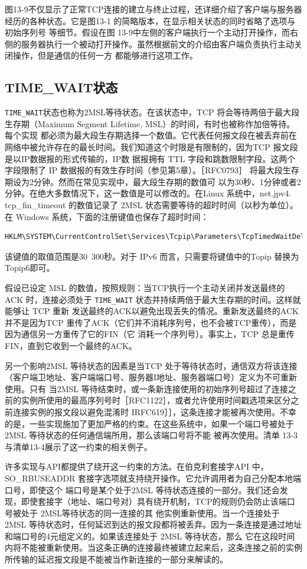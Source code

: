 图13-9不仅显示了正常TCP连接的建立与终止过程，还详细介绍了客户端与服务器经历的各种状态。它是图13-1 的简略版本，在显示相关状态的同时省略了选项与初始序列号
等细节。假设在图 13-9中左侧的客户端执行一个主动打开操作，而右侧的服务器执行一个被动打开操作。虽然根据前文的介绍由客户端负责执行主动关闭操作，但是通信的任何一方
都能够进行这项工作。

\subsection{TIME\_WAIT状态 }
\verb|TIME_WAIT|状态也称为2MSL等待状态。在该状态中，TCP 将会等待两倍于最大段生存期（Maximum Segment Lifetime, MSL）的时间，有时也被称作加倍等待。每个实现
都必须为最大段生存期选择一个数值。它代表任何报文段在被丢弃前在网络中被允许存在的最长时间。我们知道这个时限是有限制的，因为TCP 报文段是以IP数据报的形式传输的，IP数
据报拥有 TTL 字段和跳数限制字段。这两个字段限制了 IP 数据报的有效生存时间（参见第5章）。［RFC0793］ 将最大段生存期设为2分钟。然而在常见实现中，最大段生存期的数值可
以为30秒、1分钟或者2分钟。在绝大多数情况下，这一数值是可以修改的。在Linux 系统中，net.jpv4. tcp\_fin\_timeout 的数值记录了 2MSL 状态需要等待的超时时间（以秒为单位）。
在 Windows 系统，下面的注册键值也保存了超时时间：
\begin{lstlisting}[language=bash]
HKLM\SYSTEM\CurrentControlSet\Services\Tcpip\Parameters\TcpTimedWaitDelay
\end{lstlisting}
该键值的取值范围是30~300秒。对于 IPv6 而言，只需要将键值中的Topip 替换为 Topip6即可。

假设已设定 MSL 的数值，按照规则：当TCP执行一个主动关闭并发送最终的ACK 时，连接必须处于 \verb|TIME_WAIT| 状态并持续两倍于最大生存期的时间。这样就能够让 TCP 重新
发送最终的ACK以避免出现丢失的情况。重新发送最终的ACK 并不是因为TCP 重传了ACK（它们并不消耗序列号，也不会被TCP重传），而是因为通信另一方重传了它的FIN（它
消耗一个序列号）。事实上，TCP 总是重传 FIN，直到它收到一个最终的ACK。

另一个影响2MSL 等待状态的因素是当TCP 处于等待状态时，通信双方将该连接（客户端卫地址、客户端端口号、服务器I地址、服务器端口号）定义为不可重新使用。只有
当2MSL 等待结束时，或一条新连接使用的初始序列号超过了连接之前的实例所使用的最高序列号时［RFC1122］，或者允许使用时间戳选项来区分之前连接实例的报文段以避免混淆时
IRFC619］］，这条连接才能被再次使用。不幸的是，一些实现施加了更加严格的约束。在这些系统中，如果一个端口号被处于 2MSL 等待状态的任何通信端所用，那么该端口号将不能
被再次使用。清单 13-3与清单13-4展示了这一约束的相关例子。

许多实现与API都提供了绕开这一约束的方法。在伯克利套接字API 中，SO\_RBUSEADDR 套接字选项就支持绕开操作。它允许调用者为自己分配本地端口号，即使这个
端口号是某个处于2MSL 等待状态连接的一部分。我们还会发现，即使套接字（地址、端口号对）具有绕开机制，TCP的规则仍会防止该端口号被处于 2MSL等待状态的同一连接的其
他实例重新使用。当一个连接处于 2MSL 等待状态时，任何延迟到达的报文段都将被丢弃。因为一条连接是通过地址和端口号的4元组定义的。如果该连接处于 2MSL 等待状态，那么
它在这段时间内将不能被重新使用。当这条正确的连接最终被建立起来后，这条连接之前的实例所传输的延迟报文段是不能被当作新连接的一部分来解读的。

